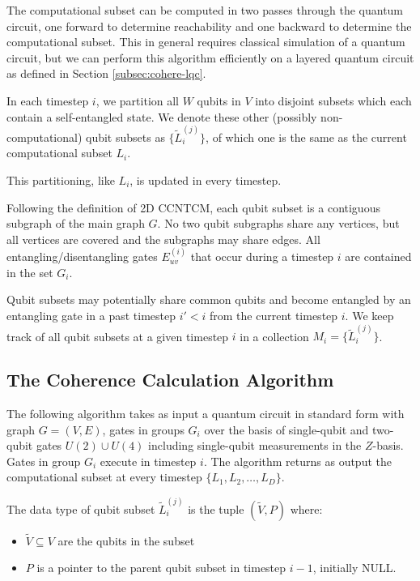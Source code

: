 The computational subset can be computed in two passes through
the quantum circuit, one forward to determine reachability and one backward
to determine the computational subset. This in general requires classical simulation of a
quantum circuit, but we can perform this algorithm efficiently on a
layered quantum circuit as defined in Section \ref{subsec:cohere-lqc}.

In each timestep $i$, we partition all $W$ qubits in $V$ into disjoint
subsets which each contain a self-entangled state. We denote these other
(possibly non-computational) qubit subsets as $\{\tilde{L}^{(j)}_i\}$, of which one is the same as the current
computational subset $L_i$.

This partitioning, like $L_i$, is updated in
every timestep.

Following the definition of \textsf{2D CCNTCM}, each qubit subset is a
contiguous subgraph of the main graph $G$. No two qubit subgraphs share any vertices,
but all vertices are covered and the subgraphs may share edges. All entangling/disentangling gates $E^{(i)}_{uv}$
that occur during a timestep $i$ are contained in the set $G_i$.

Qubit subsets may potentially share common qubits and become entangled by an entangling gate
in a past timestep $i' < i$ from the current timestep $i$.
We keep track of all qubit subsets at a given timestep $i$
in a collection $M_i = \{\tilde{L}^{(j)}_i \}$.

\subsection{The Coherence Calculation Algorithm}
\label{subsec:cohere-algo}

The following algorithm takes as input a quantum circuit in standard form
with graph $G = (V,E)$, gates in groups $G_i$
over the basis of single-qubit and two-qubit gates
$U(2) \cup U(4)$ including single-qubit measurements in the $Z$-basis.
Gates in group $G_i$ execute in timestep $i$.
The algorithm returns as output the computational subset at every timestep $\{ L_1, L_2, \ldots, L_D \}$.

The data type of qubit subset $\tilde{L}^{(j)}_i$ is the tuple
$(\tilde{V}, P)$ where:

\begin{itemize}
\item $\tilde{V} \subseteq V$ are the qubits in the subset
\item $P$ is a pointer to the parent qubit subset in timestep ${i-1}$, initially \textsc{NULL}.
\end{itemize}


